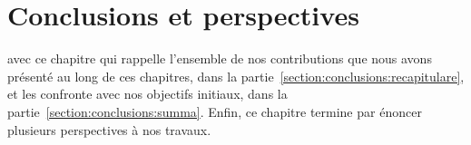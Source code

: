 \chapter{Conclusions et perspectives}
\label{chapter:conclusions}

\mminitoc

 avec ce
chapitre qui rappelle l'ensemble de nos contributions que nous avons présenté au
long de ces chapitres, dans la partie~\ref{section:conclusions:recapitulare}, et
les confronte avec nos objectifs initiaux, dans la
partie~\ref{section:conclusions:summa}. Enfin, ce chapitre termine par énoncer
plusieurs perspectives à nos travaux.

